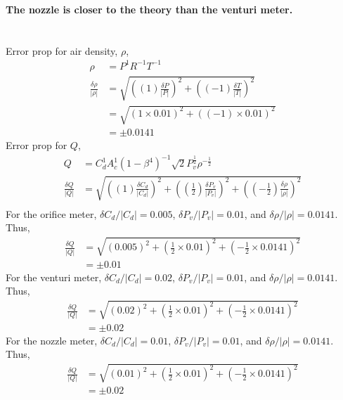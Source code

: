 \textbf{The nozzle is closer to the theory than the venturi meter.}

\section{}
Error prop for air density, $\rho$,
\begin{align*}
    \rho &= P^1 R^{-1} T^{-1} \\
    \frac{\delta \rho}{|\rho|} &= \sqrt{\left((1) \frac{\delta P}{|P|}\right)^2 +  \left((-1)\frac{\delta T}{|T|}\right)^2} \\
    &= \sqrt{\left(1\times 0.01\right)^2 + \left((-1)\times 0.01\right)^2} \\
    &= \pm 0.0141
\end{align*}
Error prop for $Q$,
\begin{align*}
    Q &= C_{d}^1 A_{c}^1 (1-\beta^4)^{-1} \sqrt{2}P_{v}^{\frac{1}{2}} \rho^{-\frac{1}{2}} \\
    \frac{\delta Q}{|Q|} &= \sqrt{\left((1) \frac{\delta C_d}{|C_d|}\right)^2 + \left(\left(\frac{1}{2}\right)\frac{\delta P_v}{|P_v|}\right)^2
    + \left(\left(-\frac{1}{2}\right)\frac{\delta \rho}{|\rho|}\right)^2} \\
\end{align*}
For the orifice meter, $\delta C_d/|C_d| = 0.005$, $\delta P_v/|P_v| = 0.01$, and $\delta \rho/|\rho| = 0.0141$. Thus,
\begin{align*}
    \frac{\delta Q}{|Q|} &= \sqrt{\left(0.005\right)^2 + \left(\frac{1}{2}\times 0.01\right)^2 + \left(-\frac{1}{2}\times 0.0141\right)^2} \\
    &= \pm 0.01
\end{align*}
For the venturi meter, $\delta C_d/|C_d| = 0.02$, $\delta P_v/|P_v| = 0.01$, and $\delta \rho/|\rho| = 0.0141$. Thus,
\begin{align*}
    \frac{\delta Q}{|Q|} &= \sqrt{\left(0.02\right)^2 + \left(\frac{1}{2}\times 0.01\right)^2 + \left(-\frac{1}{2}\times 0.0141\right)^2} \\
    &= \pm 0.02
\end{align*}
For the nozzle meter, $\delta C_d/|C_d| = 0.01$, $\delta P_v/|P_v| = 0.01$, and $\delta \rho/|\rho| = 0.0141$. Thus,
\begin{align*}
    \frac{\delta Q}{|Q|} &= \sqrt{\left(0.01\right)^2 + \left(\frac{1}{2}\times 0.01\right)^2 + \left(-\frac{1}{2}\times 0.0141\right)^2} \\
    &= \pm 0.02
\end{align*}

